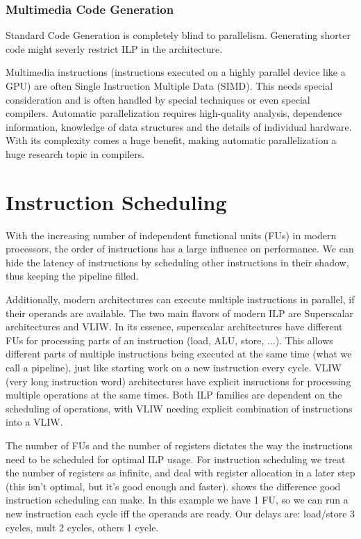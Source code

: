 \documentclass{article}
\begin{document}
\subsubsection{Multimedia Code Generation}
Standard Code Generation is completely blind to parallelism.
Generating shorter code might severly restrict ILP in the architecture.

Multimedia instructions (instructions executed on a highly parallel device like a GPU) are often Single Instruction Multiple Data (SIMD).
This needs special consideration and is often handled by special techniques or even special compilers.
Automatic parallelization requires high-quality analysis, dependence information, knowledge of data structures and the details of individual hardware.
With its complexity comes a huge benefit, making automatic parallelization a huge research topic in compilers.

\section{Instruction Scheduling}
With the increasing number of independent functional units (FUs) in modern processors, the order of instructions has a large influence on performance.
We can hide the latency of instructions by scheduling other instructions in their shadow, thus keeping the pipeline filled.

Additionally, modern architectures can execute multiple instructions in parallel, if their operands are available.
The two main flavors of modern ILP are Superscalar architectures and VLIW.
In its essence, superscalar architectures have different FUs for processing parts of an instruction (load, ALU, store, ...).
This allows different parts of multiple instructions being executed at the same time (what we call a pipeline), just like starting work on a new instruction every cycle.
VLIW (very long instruction word) architectures have explicit insructions for processing multiple operations at the same times.
Both ILP families are dependent on the scheduling of operations, with VLIW needing explicit combination of instructions into a VLIW.

The number of FUs and the number of registers dictates the way the instructions need to be scheduled for optimal ILP usage.
For instruction scheduling we treat the number of registers as infinite, and deal with register allocation in a later step (this isn't optimal, but it's good enough and faster).
 shows the difference good instruction scheduling can make.
In this example we have 1 FU, so we can run a new instruction each cycle iff the operands are ready.
Our delays are: load/store 3 cycles, mult 2 cycles, others 1 cycle.
\end{document}
